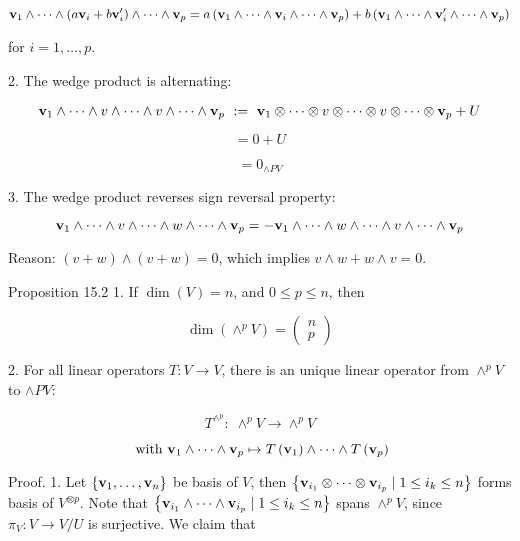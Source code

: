 \documentclass[11pt]{article}
\begin{document}
\[
{\bf v}_1 \land  \cdots  \land  \left( {a{\bf v}_{i} + b{\bf v}_{i}^{\prime }}\right)  \land  \cdots  \land  {\bf v}_{p} = a\left( {{\bf v}_1 \land  \cdots  \land  {\bf v}_{i} \land  \cdots  \land  {\bf v}_{p}}\right)  + b\left( {{\bf v}_1 \land  \cdots  \land  {\bf v}_{i}^{\prime } \land  \cdots  \land  {\bf v}_{p}}\right)
\]

for \(i = 1,\ldots ,p\).

2. The wedge product is alternating:

\[
{\bf v}_1 \land  \cdots  \land  v \land  \cdots  \land  v \land  \cdots  \land  {\bf v}_{p} \mathrel{\text{ := }} {\bf v}_1 \otimes  \cdots  \otimes  v \otimes  \cdots  \otimes  v \otimes  \cdots  \otimes  {\bf v}_{p} + U
\]

\[
= 0 + U
\]

\[
= {0}_{\land {PV}}
\]

3. The wedge product reverses sign reversal property:

\[
{\bf v}_1 \land  \cdots  \land  v \land  \cdots  \land  w \land  \cdots  \land  {\bf v}_{p} =  - {\bf v}_1 \land  \cdots  \land  w \land  \cdots  \land  v \land  \cdots  \land  {\bf v}_{p}
\]

Reason: \(\left( {v + w}\right)  \land  \left( {v + w}\right)  = 0\), which implies \(v \land  w + w \land  v = 0\).

Proposition 15.2 1. If \(\dim \left( V\right)  = n\), and \(0 \leq  p \leq  n\), then

\[
\dim \left( {{ \land  }^{p}V}\right)  = \left( \begin{array}{l} n \\  p \end{array}\right)
\]

2. For all linear operators \(T : V \rightarrow  V\), there is an unique linear operator from \({ \land  }^{p}V\) to \(\land  {PV} :\)

\[
{T}^{{ \land  }^{p}} : \;{ \land  }^{p}V \rightarrow  { \land  }^{p}V
\]

\[
\text{ with }{\bf v}_1 \land  \cdots  \land  {\bf v}_{p} \mapsto  T\left( {\bf v}_1\right)  \land  \cdots  \land  T\left( {\bf v}_{p}\right)
\]

Proof. 1. Let \(\left\{  {{\bf v}_1,\ldots ,{\bf v}_n}\right\}\) be basis of \(V\), then \(\left\{  {{\bf v}_{{i}_1} \otimes  \cdots  \otimes  {\bf v}_{{i}_{p}} \mid  1 \leq  {i}_{k} \leq  n}\right\}\) forms basis of \({V}^{\otimes p}\). Note that \(\left\{  {{\bf v}_{{i}_1} \land  \cdots  \land  {\bf v}_{{i}_{p}} \mid  1 \leq  {i}_{k} \leq  n}\right\}\) spans \({ \land  }^{p}V\), since \({\pi }_{V} : V \rightarrow  V/U\) is surjective. We claim that
\end{document}
